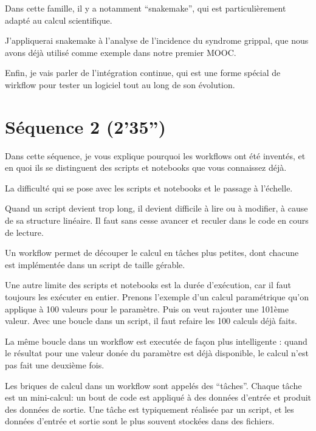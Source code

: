 \documentclass[12pt]{article}
\begin{document}
Dans cette famille, il y a notamment ``snakemake'', qui est
particulièrement adapté au calcul scientifique.

J'appliquerai snakemake à l'analyse de l'incidence du syndrome
grippal, que nous avons déjà utilisé comme exemple dans notre premier
MOOC.

Enfin, je vais parler de l'intégration continue, qui est une forme
spécial de wirkflow pour tester un logiciel tout au long de son
évolution.

\newpage

\section*{Séquence 2 (2'35'')}

Dans cette séquence, je vous explique pourquoi les workflows ont été
inventés, et en quoi ils se distinguent des scripts et notebooks que
vous connaissez déjà.

\newpage

La difficulté qui se pose avec les scripts et notebooks et le passage
à l'échelle.

Quand un script devient trop long, il devient difficile à lire ou à
modifier, à cause de sa structure linéaire. Il faut sans cesse avancer
et reculer dans le code en cours de lecture.

Un workflow permet de découper le calcul en tâches plus petites, dont
chacune est implémentée dans un script de taille gérable.

\newpage

Une autre limite des scripts et notebooks est la durée d'exécution,
car il faut toujours les exécuter en entier. Prenons l'exemple d'un
calcul paramétrique qu'on applique à 100 valeurs pour le paramètre.
Puis on veut rajouter une 101ème valeur. Avec une boucle dans un
script, il faut refaire les 100 calculs déjà faits.

La même boucle dans un workflow est executée de façon plus intelligente :
quand le résultat pour une valeur donée du paramètre est déjà disponible,
le calcul n'est pas fait une deuxième fois.

\newpage

Les briques de calcul dans un workflow sont appelés des
``tâches''. Chaque tâche est un mini-calcul: un bout de code est
appliqué à des données d'entrée et produit des données de sortie. Une
tâche est typiquement réalisée par un script, et les données d'entrée
et sortie sont le plus souvent stockées dans des fichiers.
\end{document}
